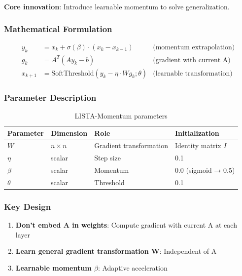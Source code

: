 \documentclass[11pt,a4paper]{article}
\begin{document}
\textbf{Core innovation}: Introduce learnable momentum to solve generalization.

\subsubsection{Mathematical Formulation}

\begin{equation}
\boxed{
\begin{aligned}
y_k &= x_k + \sigma(\beta) \cdot (x_k - x_{k-1}) & \text{(momentum extrapolation)} \\
g_k &= A^T(A y_k - b) & \text{(gradient with current A)} \\
x_{k+1} &= \text{SoftThreshold}(y_k - \eta \cdot W g_k; \theta) & \text{(learnable transformation)}
\end{aligned}
}
\end{equation}

\subsubsection{Parameter Description}

\begin{table}[h]
\centering
\begin{tabular}{llll}
\toprule
\textbf{Parameter} & \textbf{Dimension} & \textbf{Role} & \textbf{Initialization} \\
\midrule
$W$ & $n \times n$ & Gradient transformation & Identity matrix $I$ \\
$\eta$ & scalar & Step size & 0.1 \\
$\beta$ & scalar & Momentum & 0.0 (sigmoid → 0.5) \\
$\theta$ & scalar & Threshold & 0.1 \\
\bottomrule
\end{tabular}
\caption{LISTA-Momentum parameters}
\label{tab:params}
\end{table}

\subsubsection{Key Design}

\begin{enumerate}
    \item \textbf{Don't embed A in weights}: Compute gradient with current A at each layer
    \item \textbf{Learn general gradient transformation W}: Independent of A
    \item \textbf{Learnable momentum $\beta$}: Adaptive acceleration
\end{enumerate}
\end{document}
